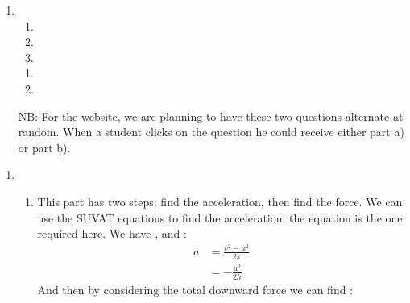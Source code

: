 

\begin{problem}[HE+_Lift]%
{\begin{enumerate}
\item {} 
\begin{enumerate} 
	\item {}
	\item {}
\item {} 
\end{enumerate}
\begin{enumerate}
	\item {}
	\item {}
\end{enumerate}
NB: For the website, we are planning to have these two questions alternate at random. When a student clicks on the question he could receive either part a) or part b).
\end{enumerate}
}
{}
{\begin{enumerate}
\item
\begin{enumerate}
	\item This part has two steps; find the acceleration, then find the force. We can use the SUVAT equations to find the acceleration; the equation  is the one required here. We have ,  and :
\begin{eqnarray*} 
a &= \frac{v^{2} - u^{2}}{2s} \\ 
&= -\frac{u^{2}}{2h} 
\end{eqnarray*}
And then by considering the total downward force we can find :
\begin{eqnarray*} 

\end{eqnarray*}
\end{enumerate}
\end{enumerate}}
\end{problem}
